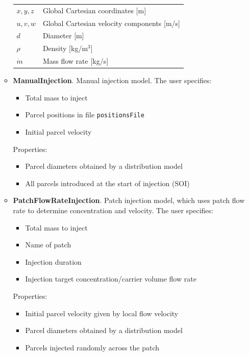 \documentclass[12pt]{article}
\begin{document}
\begin{itemize}
\begin{itemize}
        \begin{tabular}{lp{8cm}}
            $x, y, z$ & Global Cartesian coordinates [m] \\
            $u, v, w$ & Global Cartesian velocity components [m/s] \\
            $d$       & Diameter [m] \\
            $\rho$    & Density [kg/m$^3$] \\
            $\dot{m}$ & Mass flow rate [kg/s] \\
        \end{tabular}
        \item \textbf{ManualInjection}.
        Manual injection model.
        The user specifies:
        \begin{itemize}
            \item Total mass to inject
            \item Parcel positions in file \texttt{positionsFile}
            \item Initial parcel velocity
        \end{itemize}
        Properties:
        \begin{itemize}
            \item Parcel diameters obtained by a distribution model
            \item All parcels introduced at the start of injection (SOI)
        \end{itemize}
        \item \textbf{PatchFlowRateInjection}.
        Patch injection model, which uses patch flow rate to determine concentration and velocity.
        The user specifies:
        \begin{itemize}
            \item Total mass to inject
            \item Name of patch
            \item Injection duration
            \item Injection target concentration/carrier volume flow rate
        \end{itemize}
        Properties:
        \begin{itemize}
            \item Initial parcel velocity given by local flow velocity
            \item Parcel diameters obtained by a distribution model
            \item Parcels injected randomly across the patch
        \end{itemize}

\end{itemize}
\end{itemize}
\end{document}
